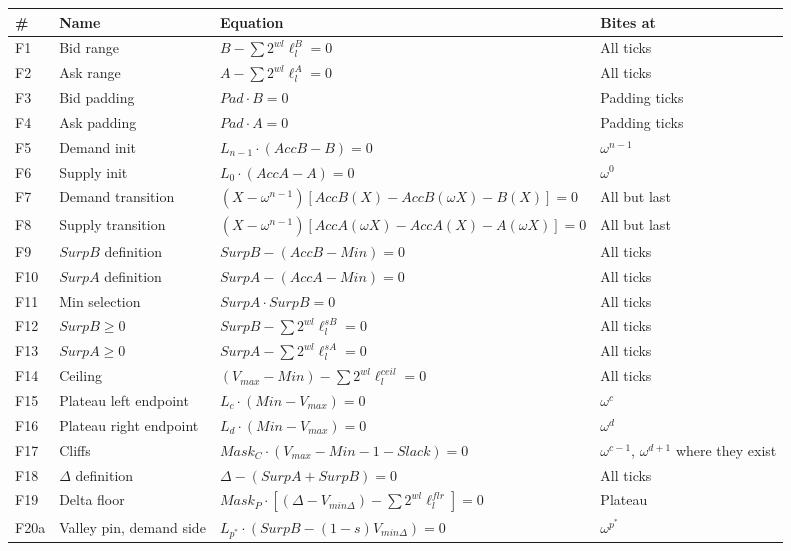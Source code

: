 \begin{longtable}[]{@{}llll@{}}
\toprule\noalign{}
\# & Name & Equation & Bites at \\
\midrule\noalign{}
\endhead
\bottomrule\noalign{}
\endlastfoot
F1 & Bid range & \(B - \sum 2^{wl} \ell^{B}_l = 0\) & All ticks \\
F2 & Ask range & \(A - \sum 2^{wl} \ell^{A}_l = 0\) & All ticks \\
F3 & Bid padding & \(Pad \cdot B = 0\) & Padding ticks \\
F4 & Ask padding & \(Pad \cdot A = 0\) & Padding ticks \\
F5 & Demand init & \(L_{n-1} \cdot (AccB - B) = 0\) & \(\omega^{n-1}\) \\
F6 & Supply init & \(L_0 \cdot (AccA - A) = 0\) & \(\omega^0\) \\
F7 & Demand transition & \((X-\omega^{n-1})[AccB(X) - AccB(\omega X) - B(X)] = 0\) & All but last \\
F8 & Supply transition & \((X-\omega^{n-1})[AccA(\omega X) - AccA(X) - A(\omega X)] = 0\) & All but last \\
F9 & \(SurpB\) definition & \(SurpB - (AccB - Min) = 0\) & All ticks \\
F10 & \(SurpA\) definition & \(SurpA - (AccA - Min) = 0\) & All ticks \\
F11 & Min selection & \(SurpA \cdot SurpB = 0\) & All ticks \\
F12 & \(SurpB \ge 0\) & \(SurpB - \sum 2^{wl} \ell^{sB}_l = 0\) & All ticks \\
F13 & \(SurpA \ge 0\) & \(SurpA - \sum 2^{wl} \ell^{sA}_l = 0\) & All ticks \\
F14 & Ceiling & \((V_{max} - Min) - \sum 2^{wl} \ell^{ceil}_l = 0\) & All ticks \\
F15 & Plateau left endpoint & \(L_c \cdot (Min - V_{max}) = 0\) & \(\omega^c\) \\
F16 & Plateau right endpoint & \(L_d \cdot (Min - V_{max}) = 0\) & \(\omega^d\) \\
F17 & Cliffs & \(Mask_C \cdot (V_{max} - Min - 1 - Slack) = 0\) & \(\omega^{c-1}\), \(\omega^{d+1}\) where they exist \\
F18 & \(\Delta\) definition & \(\Delta - (SurpA + SurpB) = 0\) & All ticks \\
F19 & Delta floor & \(Mask_P \cdot [(\Delta - V_{min\Delta}) - \sum 2^{wl} \ell^{flr}_l] = 0\) & Plateau \\
F20a & Valley pin, demand side & \(L_{p^*} \cdot (SurpB - (1-s)V_{min\Delta}) = 0\) & \(\omega^{p^*}\) \\

\end{longtable}
